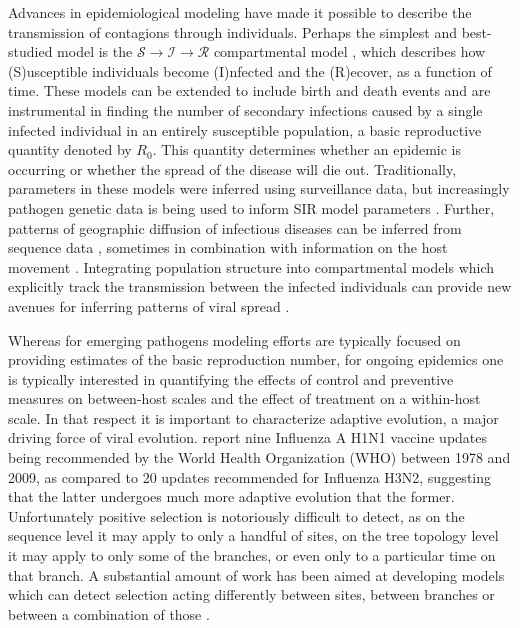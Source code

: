 Advances in epidemiological modeling have made it possible to describe the transmission of contagions through individuals.
Perhaps the simplest and best-studied model is the ${\mathcal{S} \rightarrow \mathcal{I} \rightarrow \mathcal{R}}$  compartmental model %
, which describes how (S)usceptible individuals become (I)nfected and the (R)ecover, as a function of time.  
These models can be extended to include birth and death events %
and are instrumental in finding the number of secondary infections caused by a single infected individual in an entirely susceptible population, a basic reproductive quantity denoted by $R_{0}$.
This quantity determines whether an epidemic is occurring or whether the spread of the disease will die out.
Traditionally, parameters in these models were inferred using surveillance data, %
but increasingly pathogen genetic data is being used to inform SIR model parameters \citep{Volz2009}.
Further, patterns of geographic diffusion of infectious diseases can be inferred from sequence data \citep{Lemey2009}, sometimes in combination with information on the host movement \citep{Lemey2014}. 
Integrating population structure into compartmental models which explicitly track the transmission between the infected individuals can provide new avenues for inferring patterns of viral spread \citep{Rasmussen2014}.

Whereas for emerging pathogens modeling efforts are typically focused on providing estimates of the basic reproduction number, for ongoing epidemics one is typically interested in quantifying the effects of control and preventive measures on between-host scales and the effect of treatment on a within-host scale.
In that respect it is important to characterize adaptive evolution, 
a major driving force of viral evolution.
\cite{Volz2013} report nine Influenza A H1N1 vaccine updates being recommended by the World Health Organization (WHO) between 1978 and 2009, as compared to 20 updates recommended for Influenza H3N2, suggesting that the latter undergoes much more adaptive evolution that the former.
Unfortunately positive selection is notoriously difficult to detect, as on the sequence level it may apply to only a handful of sites, on the tree topology level it may apply to only some of the branches, or even only to a particular time on that branch.
A substantial amount of work has been aimed at developing models which can detect selection acting differently between sites, between branches or between a combination of those \citep{NY98, Pond2005a, Goode2008}.

